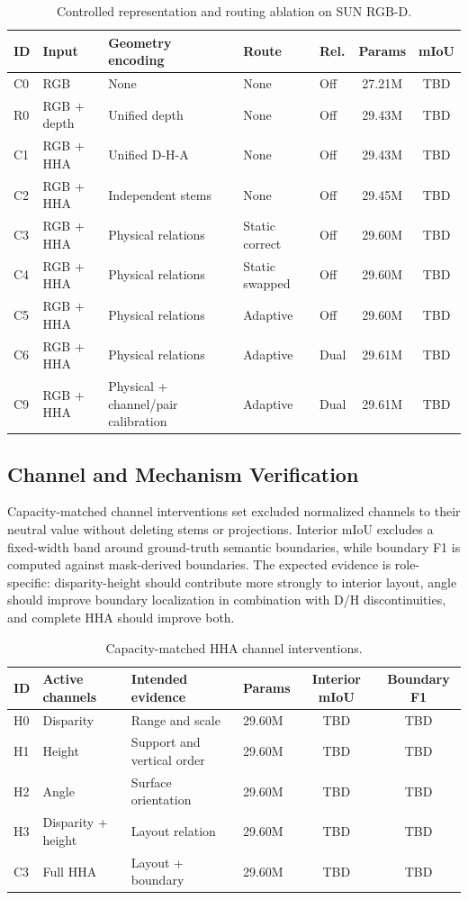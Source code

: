 \documentclass[a4paper,fleqn]{cas-dc}
\begin{document}
\begin{table}%
\caption{Controlled representation and routing ablation on SUN RGB-D.}\label{tab:ablation}
\begin{tabular*}{\tblwidth}{@{\extracolsep{\fill}}lllllcc@{}}
\toprule
ID & Input & Geometry encoding & Route & Rel. & Params & mIoU \\
\midrule
C0 & RGB & None & None & Off & 27.21M & TBD \\
R0 & RGB + depth & Unified depth & None & Off & 29.43M & TBD \\
C1 & RGB + HHA & Unified D-H-A & None & Off & 29.43M & TBD \\
C2 & RGB + HHA & Independent stems & None & Off & 29.45M & TBD \\
C3 & RGB + HHA & Physical relations & Static correct & Off & 29.60M & TBD \\
C4 & RGB + HHA & Physical relations & Static swapped & Off & 29.60M & TBD \\
C5 & RGB + HHA & Physical relations & Adaptive & Off & 29.60M & TBD \\
C6 & RGB + HHA & Physical relations & Adaptive & Dual & 29.61M & TBD \\
C9 & RGB + HHA & Physical + channel/pair calibration & Adaptive & Dual & 29.61M & TBD \\
\bottomrule
\end{tabular*}
\end{table}

\subsection{Channel and Mechanism Verification}

Capacity-matched channel interventions set excluded normalized channels to their neutral value without deleting stems or projections. Interior mIoU excludes a fixed-width band around ground-truth semantic boundaries, while boundary F1 is computed against mask-derived boundaries. The expected evidence is role-specific: disparity-height should contribute more strongly to interior layout, angle should improve boundary localization in combination with D/H discontinuities, and complete HHA should improve both.

\begin{table}%
\caption{Capacity-matched HHA channel interventions.}\label{tab:channels}
\begin{tabular*}{\tblwidth}{@{\extracolsep{\fill}}llllcc@{}}
\toprule
ID & Active channels & Intended evidence & Params & Interior mIoU & Boundary F1 \\
\midrule
H0 & Disparity & Range and scale & 29.60M & TBD & TBD \\
H1 & Height & Support and vertical order & 29.60M & TBD & TBD \\
H2 & Angle & Surface orientation & 29.60M & TBD & TBD \\
H3 & Disparity + height & Layout relation & 29.60M & TBD & TBD \\
C3 & Full HHA & Layout + boundary & 29.60M & TBD & TBD \\
\bottomrule
\end{tabular*}
\end{table}
\end{document}
